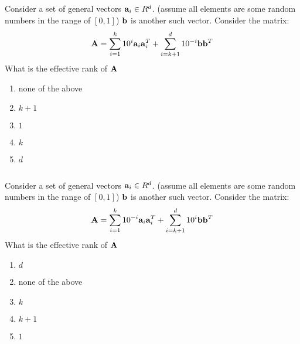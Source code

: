 \begin{frame}
\section{}
  Consider a set of general vectors ${\bf a}_i\in R^d$. (assume all elements are some random numbers in the range of $[0,1]$)
  ${\bf b}$ is another such vector. Consider the matrix:
  \[ {\bf A} = \sum_{i=1}^k 10^{i} {\bf a}_i {\bf a}_i^T + \sum_{i=k+1}^d 10^{-i}{\bf b}{\bf b}^T\]
  What is the effective rank of ${\bf A}$
 
\begin{enumerate}[label=(\Alph*)]
\item none of the above
\item $k+1$
\item $1$
\item $k$
\item $d$ 
\end{enumerate}
\end{frame}

\begin{frame}
\section{}
  Consider a set of general vectors ${\bf a}_i\in R^d$. (assume all elements are some random numbers in the range of $[0,1]$)
  ${\bf b}$ is another such vector. Consider the matrix:
  \[ {\bf A} = \sum_{i=1}^k 10^{-i} {\bf a}_i {\bf a}_i^T + \sum_{i=k+1}^d 10^{i}{\bf b}{\bf b}^T\]
   What is the effective rank of ${\bf A}$
 
\begin{enumerate}[label=(\Alph*)]
\item $d$
\item none of the above
\item $k$
\item $k+1$
\item $1$ 
\end{enumerate}
\end{frame}
